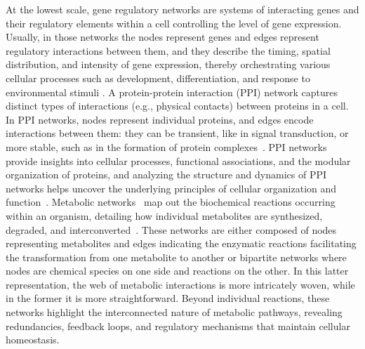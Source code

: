 \documentclass[12pt]{article}
\renewcommand{\(}{\left(}
\renewcommand{\)}{\right)}
\renewcommand{\[}{\left[}
\renewcommand{\]}{\right]}
\begin{document}
At the lowest scale, gene regulatory networks are systems of interacting genes and their regulatory elements within a cell controlling the level of gene expression. Usually, in those networks the nodes represent genes and edges represent regulatory interactions between them, and they describe the timing, spatial distribution, and intensity of gene expression, thereby orchestrating various cellular processes such as development, differentiation, and response to environmental stimuli \cite{thattai2001intrinsic,levine2005gene,davidson2005gene,karlebach2008modelling}. A protein-protein interaction (PPI) network captures distinct types of interactions (e.g., physical contacts) between proteins in a cell. In PPI networks, nodes represent individual proteins, and edges encode interactions between them: they can be transient, like in signal transduction, or more stable, such as in the formation of protein complexes~\cite{vazquez2003global,szklarczyk2015string}. PPI networks provide insights into cellular processes, functional associations, and the modular organization of proteins, and analyzing the structure and dynamics of PPI networks helps uncover the underlying principles of cellular organization and function~\cite{han2004evidence,han2005effect,stelzl2005human,deeds2006simple,stelzl2006value,dittrich2008identifying,nepusz2012detecting,correia2024conserved}. Metabolic networks~\cite{jeong2000large,liu2013observability,nunez2024rare} map out the biochemical reactions occurring within an organism, detailing how individual metabolites are synthesized, degraded, and interconverted~\cite{guimera2005functional}. These networks are either composed of nodes representing metabolites and edges indicating the enzymatic reactions facilitating the transformation from one metabolite to another or bipartite networks where nodes are chemical species on one side and reactions on the other. In this latter representation, the web of metabolic interactions is more intricately woven, while in the former it is more straightforward. Beyond individual reactions, these networks highlight the interconnected nature of metabolic pathways, revealing redundancies, feedback loops, and regulatory mechanisms that maintain cellular homeostasis.
\end{document}
